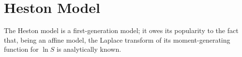 \section{Heston Model}
The Heston model is a first-generation model; it owes its popularity to the fact that, being an affine model, the Laplace transform of its moment-generating function for $\ln{S}$ is analytically known.
